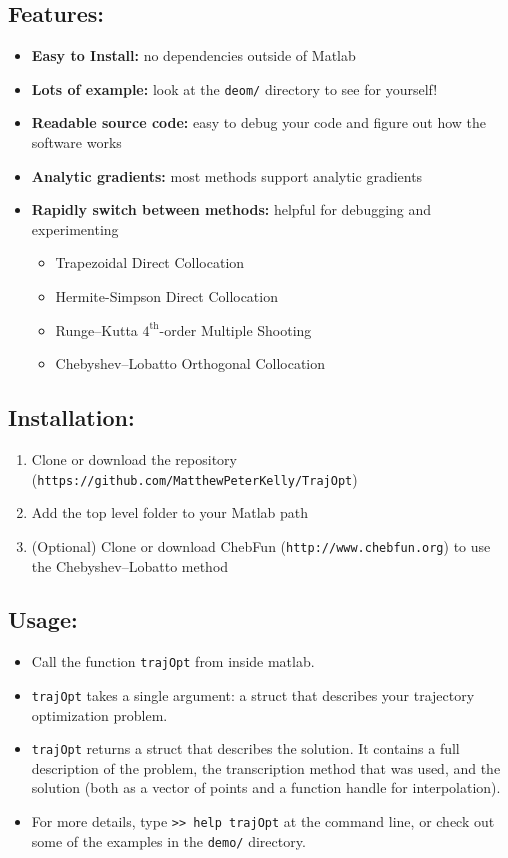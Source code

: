 \subsection{Features:}
\begin{itemize} \setlength\itemsep{-0.1em}
\item {\bf Easy to Install: } no dependencies outside of Matlab \footnotemark
\item {\bf Lots of example: } look at the \texttt{deom/} directory to see for yourself!
\item {\bf Readable source code: } easy to debug your code and figure out how the software works
\item {\bf Analytic gradients: } most methods support analytic gradients
\item {\bf Rapidly switch between methods: } helpful for debugging and experimenting
 	\begin{itemize} \setlength\itemsep{-0.1em}
 	\item Trapezoidal Direct Collocation
 	\item Hermite-Simpson Direct Collocation
 	\item Runge--Kutta $4^\text{th}$-order Multiple Shooting
 	\item Chebyshev--Lobatto Orthogonal Collocation 
 	\end{itemize}
\end{itemize}

\subsection{Installation:}
\begin{enumerate} \setlength\itemsep{-0.1em}
\item Clone or download the repository (\texttt{https://github.com/MatthewPeterKelly/TrajOpt})
\item Add the top level folder to your Matlab path
\item (Optional) Clone or download ChebFun (\texttt{http://www.chebfun.org}) to use the Chebyshev--Lobatto method
\end{enumerate}

\subsection{Usage: }
\begin{itemize} \setlength\itemsep{-0.1em}
\item Call the function \texttt{trajOpt} from inside matlab.
\item \texttt{trajOpt} takes a single argument: a struct that describes your trajectory optimization problem.
\item \texttt{trajOpt} returns a struct that describes the solution. It contains a full description of the problem, the transcription method that was used, and the solution (both as a vector of points and a function handle for interpolation).
\item For more details, type \texttt{>> help trajOpt} at the command line, or check out some of the examples in the \texttt{demo/} directory.
\end{itemize}


